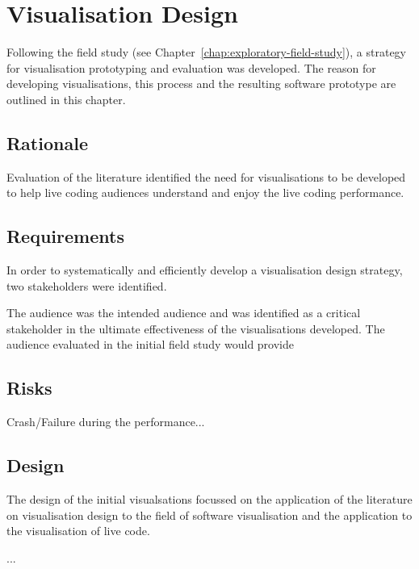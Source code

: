 
\chapter{Visualisation Design}
\label{chap:visualisation-design}

Following the field study (see Chapter~\ref{chap:exploratory-field-study}), a strategy for visualisation prototyping and evaluation was developed. The reason for developing visualisations, this process and the resulting software prototype are outlined in this chapter.


\section{Rationale}

Evaluation of the literature identified the need for visualisations to be developed to help live coding audiences understand and enjoy the live coding performance.


\section{Requirements}

In order to systematically and efficiently develop a visualisation design strategy, two stakeholders were identified.

The audience was the intended audience and was identified as a critical stakeholder in the ultimate effectiveness of the visualisations developed. The audience evaluated in the initial field study would provide 

\section{Risks}

Crash/Failure during the performance...

\section{Design}

The design of the initial visualsations focussed on the application of the literature on visualisation design to the field of software visualisation and the application to the visualisation of live code.

\cite{Ware2013a}...


